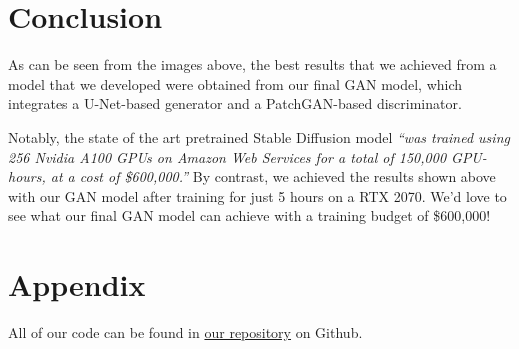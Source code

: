 \documentclass[sigconf]{acmart}
\begin{document}
\section*{Conclusion}

As can be seen from the images above, the best results that we achieved from a model that we developed were obtained from our final GAN model, which integrates a U-Net-based generator and a PatchGAN-based discriminator.

Notably, the state of the art pretrained Stable Diffusion model \textit{“was trained using 256 Nvidia A100 GPUs on Amazon Web Services for a total of 150,000 GPU-hours, at a cost of \$600,000.”} By contrast, we achieved the results shown above with our GAN model after training for just 5 hours on a RTX 2070. We’d love to see what our final GAN model can achieve with a training budget of \$600,000!

\section*{Appendix}

All of our code can be found in \textcolor{red}{\href{https://github.com/yewentao256/CS5787-Final}{our repository}} on Github.
\end{document}
